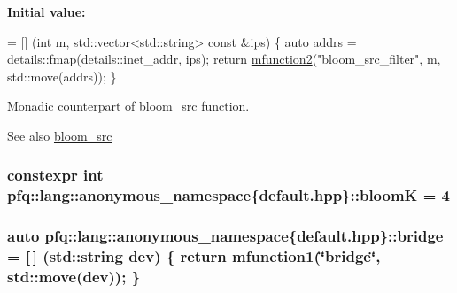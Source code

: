 {\bfseries Initial value\+:}
\begin{DoxyCode}
= [] (\textcolor{keywordtype}{int} m, std::vector<std::string> \textcolor{keyword}{const} &ips) \{
                                    \textcolor{keyword}{auto} addrs = details::fmap(details::inet\_addr, ips);
                                    \textcolor{keywordflow}{return} \hyperlink{namespacepfq_1_1lang_aab1a000712bb2711044255ca1626cc84}{mfunction2}(\textcolor{stringliteral}{"bloom\_src\_filter"}, m, std::move(addrs));
                                \}
\end{DoxyCode}


Monadic counterpart of {\ttfamily bloom\+\_\+src} function. 

\begin{DoxySeeAlso}{See also}
\hyperlink{namespacepfq_1_1lang_1_1anonymous__namespace_02default_8hpp_03_aa2a8ff506d61e93d8eca4419513970f4}{bloom\+\_\+src} 
\end{DoxySeeAlso}
\hypertarget{namespacepfq_1_1lang_1_1anonymous__namespace_02default_8hpp_03_a56750cdea1537acfa24c256b64924004}{
\subsubsection[{bloom\+K}]{\setlength{\rightskip}{0pt plus 5cm}constexpr int pfq\+::lang\+::anonymous\+\_\+namespace\{default.\+hpp\}\+::bloom\+K = 4}}\label{namespacepfq_1_1lang_1_1anonymous__namespace_02default_8hpp_03_a56750cdea1537acfa24c256b64924004}
\hypertarget{namespacepfq_1_1lang_1_1anonymous__namespace_02default_8hpp_03_ad318dd8fb6441b78bdfb056173e5a7e2}{
\subsubsection[{bridge}]{\setlength{\rightskip}{0pt plus 5cm}auto pfq\+::lang\+::anonymous\+\_\+namespace\{default.\+hpp\}\+::bridge = \mbox{[}$\,$\mbox{]} (std\+::string dev) \{ return {\bf mfunction1}(\char`\"{}bridge\char`\"{}, std\+::move(dev)); \}}}\label{namespacepfq_1_1lang_1_1anonymous__namespace_02default_8hpp_03_ad318dd8fb6441b78bdfb056173e5a7e2}


